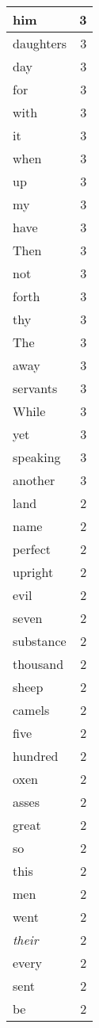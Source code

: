 \begin{center}
\begin{longtable}{l|r}
him & 3\\ \hline 
daughters & 3\\ \hline 
day & 3\\ \hline 
for & 3\\ \hline 
with & 3\\ \hline 
it & 3\\ \hline 
when & 3\\ \hline 
up & 3\\ \hline 
my & 3\\ \hline 
have & 3\\ \hline 
Then & 3\\ \hline 
not & 3\\ \hline 
forth & 3\\ \hline 
thy & 3\\ \hline 
The & 3\\ \hline 
away & 3\\ \hline 
servants & 3\\ \hline 
While & 3\\ \hline 
yet & 3\\ \hline 
speaking & 3\\ \hline 
another & 3\\ \hline 
land & 2\\ \hline 
name & 2\\ \hline 
perfect & 2\\ \hline 
upright & 2\\ \hline 
evil & 2\\ \hline 
seven & 2\\ \hline 
substance & 2\\ \hline 
thousand & 2\\ \hline 
sheep & 2\\ \hline 
camels & 2\\ \hline 
five & 2\\ \hline 
hundred & 2\\ \hline 
oxen & 2\\ \hline 
asses & 2\\ \hline 
great & 2\\ \hline 
so & 2\\ \hline 
this & 2\\ \hline 
men & 2\\ \hline 
went & 2\\ \hline 
\emph{their} & 2\\ \hline 
every & 2\\ \hline 
sent & 2\\ \hline 
be & 2\\ \hline 

\end{longtable}
\end{center}

